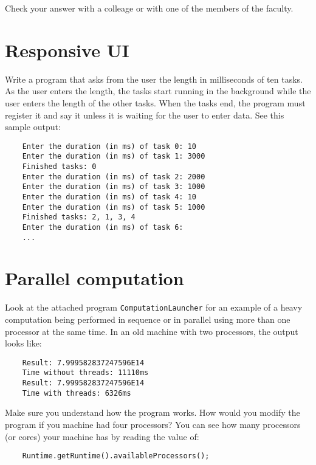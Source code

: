 \documentclass{article}
\begin{document}
Check your answer with a colleage or with one of the members of the
faculty. 

\section{Responsive UI}
\label{sec:responsive-ui}

Write a program that asks from the user the length in milliseconds of
ten tasks. As the user enters the length, the tasks start running in
the background while the user enters the length of the other
tasks. When the tasks end, the program must register it and say it
unless it is waiting for the user to enter data. See this sample
output: 

\begin{verbatim}
    Enter the duration (in ms) of task 0: 10
    Enter the duration (in ms) of task 1: 3000
    Finished tasks: 0
    Enter the duration (in ms) of task 2: 2000
    Enter the duration (in ms) of task 3: 1000
    Enter the duration (in ms) of task 4: 10
    Enter the duration (in ms) of task 5: 1000
    Finished tasks: 2, 1, 3, 4
    Enter the duration (in ms) of task 6: 
    ...
\end{verbatim}

\section{Parallel computation}
\label{sec:parallel-computation}

Look at the attached program \verb+ComputationLauncher+ for an example
of a heavy computation being performed in sequence or in parallel
using more than one processor at the same time. In an old machine with
two processors, the output looks like: 

\begin{verbatim}
    Result: 7.999582837247596E14
    Time without threads: 11110ms
    Result: 7.999582837247596E14
    Time with threads: 6326ms
\end{verbatim}

Make sure you understand how the program works. How would you modify
the program if you machine had four processors? You can see how many
processors (or cores) your machine has by reading the value of: 

\begin{verbatim}
    Runtime.getRuntime().availableProcessors();
\end{verbatim}

\end{document}
